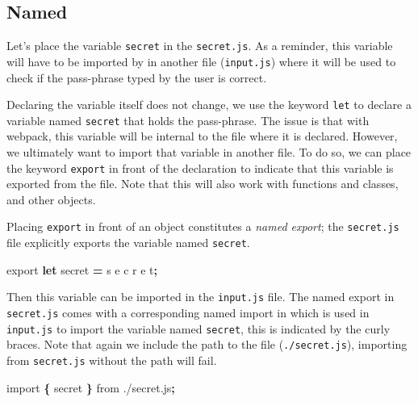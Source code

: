 \documentclass[
]{krantz}
\makeatletter
\newenvironment{Shaded}{\begin{snugshade}}{\end{snugshade}}
\newcommand{\ImportTok}[1]{#1}
\newcommand{\KeywordTok}[1]{\textcolor[rgb]{0.27,0.27,0.27}{\textbf{#1}}}
\newcommand{\NormalTok}[1]{#1}
\newcommand{\OperatorTok}[1]{\textcolor[rgb]{0.43,0.43,0.43}{\textbf{#1}}}
\newcommand{\StringTok}[1]{\textcolor[rgb]{0.5,0.5,0.5}{#1}}
\newenvironment{kframe}{%
\medskip{}
\setlength{\fboxsep}{.8em}
 \def\at@end@of@kframe{}%
 \ifinner\ifhmode%
  \def\at@end@of@kframe{\end{minipage}}%
  \begin{minipage}{\columnwidth}%
 \fi\fi%
 \def\FrameCommand##1{\hskip\@totalleftmargin \hskip-\fboxsep
 \colorbox{shadecolor}{##1}\hskip-\fboxsep
     \hskip-\linewidth \hskip-\@totalleftmargin \hskip\columnwidth}%
 \MakeFramed {\advance\hsize-\width
   \@totalleftmargin\z@ \linewidth\hsize
   \@setminipage}}%
 {\par\unskip\endMakeFramed%
 \at@end@of@kframe}
\renewenvironment{Shaded}{\begin{kframe}}{\end{kframe}}
\makeatother
\begin{document}
\hypertarget{webpack-intro-import-export-named}{%
\subsection{Named}\label{webpack-intro-import-export-named}}

Let's place the variable \texttt{secret} in the \texttt{secret.js}. As a reminder, this variable will have to be imported by in another file (\texttt{input.js}) where it will be used to check if the pass-phrase typed by the user is correct.

Declaring the variable itself does not change, we use the keyword \texttt{let} to declare a variable named \texttt{secret} that holds the pass-phrase. The issue is that with webpack, this variable will be internal to the file where it is declared. However, we ultimately want to import that variable in another file. To do so, we can place the keyword \texttt{export} in front of the declaration to indicate that this variable is exported from the file. Note that this will also work with functions and classes, and other objects.

Placing \texttt{export} in front of an object constitutes a \emph{named export}; the \texttt{secret.js} file explicitly exports the variable named \texttt{secret}.

\begin{Shaded}
\begin{Highlighting}[]
\ImportTok{export} \KeywordTok{let}\NormalTok{ secret }\OperatorTok{=} \StringTok{\textquotesingle{}s e c r e t\textquotesingle{}}\OperatorTok{;}
\end{Highlighting}
\end{Shaded}

Then this variable can be imported in the \texttt{input.js} file. The named export in \texttt{secret.js} comes with a corresponding named import in which is used in \texttt{input.js} to import the variable named \texttt{secret}, this is indicated by the curly braces. Note that again we include the path to the file (\texttt{./secret.js}), importing from \texttt{secret.js} without the path will fail.

\begin{Shaded}
\begin{Highlighting}[]
\ImportTok{import} \OperatorTok{\{}\NormalTok{ secret }\OperatorTok{\}} \ImportTok{from} \StringTok{\textquotesingle{}./secret.js\textquotesingle{}}\OperatorTok{;}
\end{Highlighting}
\end{Shaded}
\end{document}
